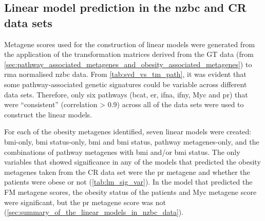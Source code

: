 \subsection{Linear model prediction in the \gls{nzbc} and CR data sets}
\label{sub:linear_model_prediction_in_the_nzbc_and_cr_data_sets}

Metagene scores used for the construction of linear models were generated from the application of the transformation matrices derived from the GT data (from \cref{sec:pathway_associated_metagenes_and_obesity_associated_metagenes}) to \gls{rma} normalised \gls{nzbc} data.
From \cref{tab:svd_vs_tm_path}, it was evident that some pathway-associated genetic signatures could be variable across different data sets.
Therefore, only six pathways (\gls{bcat}, \gls{er}, \gls{ifna}, \gls{ifny}, Myc and \gls{pr}) that were ``consistent'' (correlation \textgreater{} 0.9) across all of the data sets were used to construct the linear models.

For each of the obesity metagenes identified, seven linear models were created: \gls{bmi}-only, \gls{bmi} status-only, \gls{bmi} and \gls{bmi} status, pathway metagenes-only, and the combinations of pathway metagenes with \gls{bmi} and/or \gls{bmi} status.
The only variables that showed significance in any of the models that predicted the obesity metagenes taken from the CR data set were the \gls{pr} metagene and whether the patients were obese or not (\cref{tab:lm_sig_var}).
In the model that predicted the FM metagene scores, the obesity status of the patients and Myc metagene score were significant, but the \gls{pr} metagene score was not (\cref{sec:summary_of_the_linear_models_in_nzbc_data}).

